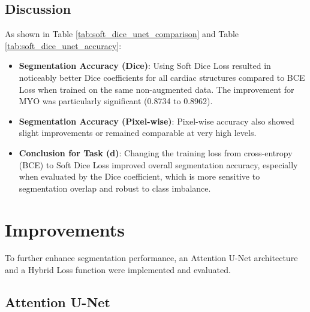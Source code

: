 \documentclass{article}
\begin{document}
\subsection{Discussion}
As shown in Table \ref{tab:soft_dice_unet_comparison} and Table \ref{tab:soft_dice_unet_accuracy}:
\begin{itemize}
  \item \textbf{Segmentation Accuracy (Dice)}: Using Soft Dice Loss resulted in noticeably better Dice coefficients for all cardiac structures compared to BCE Loss when trained on the same non-augmented data. The improvement for MYO was particularly significant (0.8734 to 0.8962).
  \item \textbf{Segmentation Accuracy (Pixel-wise)}: Pixel-wise accuracy also showed slight improvements or remained comparable at very high levels.
  \item \textbf{Conclusion for Task (d)}: Changing the training loss from cross-entropy (BCE) to Soft Dice Loss improved overall segmentation accuracy, especially when evaluated by the Dice coefficient, which is more sensitive to segmentation overlap and robust to class imbalance.
\end{itemize}


\section{Improvements}
To further enhance segmentation performance, an Attention U-Net architecture and a Hybrid Loss function were implemented and evaluated.

\subsection{Attention U-Net}
\end{document}
